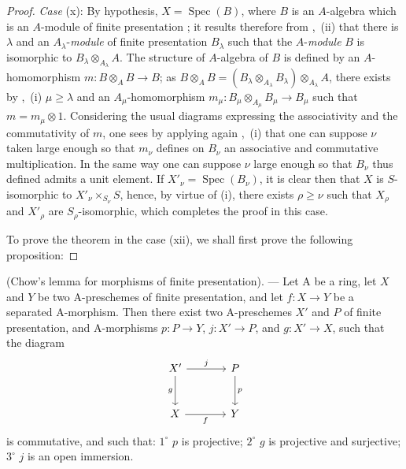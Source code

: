 \begin{proof}
\emph{Case} (x): By hypothesis, $X=\operatorname{Spec}(B)$, where $B$ is an $A$-algebra which is an $A$-module of finite presentation ; it results therefore from ,~(ii) that there is $\lambda$ and an $A_\lambda$-\emph{module} of finite presentation $B_\lambda$ such that the $A$-\emph{module} $B$ is isomorphic to $B_\lambda\otimes_{A_\lambda}A$.
The structure of $A$-algebra of $B$ is defined by an $A$-homomorphism $m:B\otimes_A B\to B$; as $B\otimes_A B=(B_\lambda\otimes_{A_\lambda}B_\lambda)\otimes_{A_\lambda} A$, there exists by ,~(i) $\mu\geqslant\lambda$ and an $A_\mu$-homomorphism $m_\mu:B_\mu\otimes_{A_\mu}B_\mu\to B_\mu$ such that $m=m_\mu\otimes 1$.
Considering the usual diagrams expressing the associativity and the commutativity of $m$, one sees by applying again ,~(i) that one can suppose $\nu$ taken large enough so that $m_\nu$ defines on $B_\nu$ an associative and commutative multiplication.
In the same way one can suppose $\nu$ large enough so that $B_\nu$ thus defined admits a unit element.
If $X'_\nu=\operatorname{Spec}(B_\nu)$, it is clear then that $X$ is $S$-isomorphic to $X'_\nu\times_{S_\nu}S$, hence, by virtue of (i), there exists $\rho\geqslant\nu$ such that $X_\rho$ and $X'_\rho$ are $S_\rho$-isomorphic, which completes the proof in this case.

To prove the theorem in the case (xii), we shall first prove the following proposition:
\end{proof}

\begin{proposition}[8.10.5.1]
\label{IV.8.10.5.1}
(Chow's lemma for morphisms of finite presentation). --- Let $\mathrm{A}$ be a ring, let $X$ and $Y$ be two $\mathrm{A}$-preschemes of finite presentation, and let $f:X\to Y$ be a separated $\mathrm{A}$-morphism. Then there exist two $\mathrm{A}$-preschemes $X'$ and $P$ of finite presentation, and $\mathrm{A}$-morphisms $p:P\to Y$, $j:X'\to P$, and $g:X'\to X$, such that the diagram
\[
\begin{tikzcd}[column sep=large,row sep=large]
X' \arrow[r,"j"] \arrow[d,"g"'] & P \arrow[d,"p"] \\
X \arrow[r,"f"'] & Y
\end{tikzcd}
\]
is commutative, and such that: $1^\circ$ $p$ is projective; $2^\circ$ $g$ is projective and surjective; $3^\circ$ $j$ is an open immersion.
\end{proposition}

